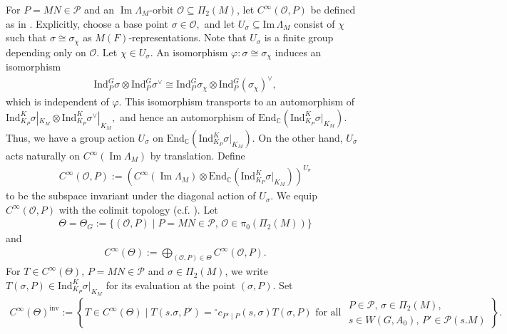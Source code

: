 \documentclass[10pt]{amsart}
\theoremstyle{definition}
\numberwithin{equation}{section}
\numberwithin{equation}{subsection}
\newcommand{\Ind}{\mathrm{Ind}}
\newcommand{\CC}{\mathbb{C}}
\renewcommand{\Im}{\mathop{\mathrm{Im}}}
\begin{document}
For $P=MN\in\mathcal{P}$ and an $\Im\Lambda_M$-orbit $\mathcal{O}\subseteq\Pi_2(M)$, let $C^\infty(\mathcal{O},P)$ be defined as in \cite[p.296]{Waldspurger:Plancherel}. Explicitly, choose a base point $\sigma\in \mathcal{O},$ and let $U_\sigma\subseteq \mathrm{Im}\, \Lambda_M$ consist of $\chi$ such that $\sigma\cong \sigma_\chi$ as $M(F)$-representations. Note that $U_\sigma$ is a finite group depending only on $\mathcal{O}$. Let $\chi\in U_\sigma.$ An isomorphism $\varphi:\sigma\cong \sigma_\chi$ induces an isomorphism 
\begin{align*}
    \mathrm{Ind}_P^G\sigma\otimes\Ind_P^{G} \sigma^\lor\cong \mathrm{Ind}_P^G \sigma_\chi\otimes \Ind_{P}^G(\sigma_\chi)^\lor,
\end{align*} which is independent of $\varphi.$ This isomorphism transports to an automorphism of $\Ind_{K_P}^K \sigma|_{K_M}\otimes \Ind_{K_P}^K \sigma^\lor|_{K_M},$ and hence an automorphism of $\mathrm{End}_\CC(\Ind_{K_P}^K \sigma|_{K_M}).$ Thus, we have a group action $U_\sigma$ on $\mathrm{End}_\CC(\Ind_{K_P}^K \sigma|_{K_M}).$ On the other hand, $U_\sigma$ acts naturally on $C^\infty(\Im\Lambda_M)$ by translation. Define
\begin{align*}
    C^\infty(\mathcal{O},P) := (C^\infty(\Im\Lambda_M)\otimes \mathrm{End}_\mathbb{C}(\Ind_{K_P}^K\sigma\vert_{K_M}))^{U_\sigma}
\end{align*}
to be the subspace invariant under the diagonal action of $U_\sigma$. We equip $C^\infty(\mathcal{O},P)$ with the colimit topology (c.f. \cite[VI.3, p.301]{Waldspurger:Plancherel}). Let
\begin{align*}
    \Theta = \Theta_G := \{(\mathcal{O},P) \mid P=MN\in\mathcal{P},\,\mathcal{O}\in \pi_0(\Pi_2(M))\}
\end{align*}
and
\begin{align*}
    C^\infty(\Theta) := \bigoplus_{(\mathcal{O},P)\in\Theta} C^\infty(\mathcal{O},P).
\end{align*}
For $T\in C^\infty(\Theta)$, $P=MN\in\mathcal{P}$ and $\sigma\in \Pi_2(M)$, we write $T(\sigma,P)\in\Ind_{K_P}^K\sigma\vert_{K_M}$ for its evaluation at the point $(\sigma,P)$. Set
\begin{align*}
    C^\infty(\Theta)^{\mathrm{inv}} := \left\{T\in C^\infty(\Theta) \mid T(s.\sigma,P') = {}^\circ c_{P'\mid P}(s,\sigma) T(\sigma,P)\text{ for all }\begin{array}{l}
         P\in\mathcal{P},\,\sigma\in\Pi_2(M),\\
         s\in W(G,A_0),\,P'\in\mathcal{P}(s.M) 
    \end{array}\right\}.
\end{align*}
\end{document}

